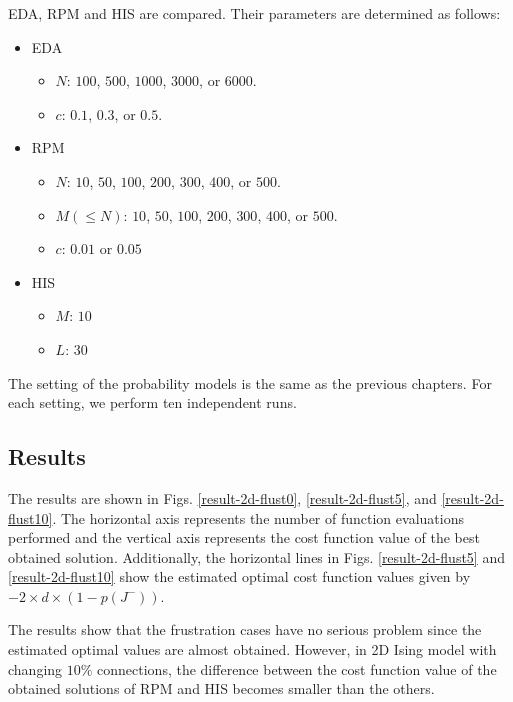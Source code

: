 EDA, RPM and HIS are compared.
Their parameters are determined as follows:
\begin{itemize}
 \item EDA
       \begin{itemize}
	\item $N$: $100$, $500$, $1000$, $3000$, or $6000$.
	\item $c$: $0.1$, $0.3$, or $0.5$.
       \end{itemize}
 \item RPM
       \begin{itemize}
	\item $N$: $10$, $50$, $100$, $200$, $300$, $400$, or $500$.
	\item $M(\leq N)$: $10$, $50$, $100$, $200$, $300$, $400$, or $500$.
	\item $c$: $0.01$ or $0.05$
       \end{itemize}
 \item HIS
       \begin{itemize}
	\item $M$: $10$
	\item $L$: $30$
       \end{itemize}
\end{itemize}
The setting of the probability models is the same as the previous chapters.
For each setting, we perform ten independent runs.


\subsection{Results}
The results are shown in Figs. \ref{result-2d-flust0},
\ref{result-2d-flust5}, and 
\ref{result-2d-flust10}.
The horizontal axis represents the number of function evaluations
performed and
the vertical axis represents the cost function value of the best
obtained solution.
Additionally, the horizontal lines in Figs.
\ref{result-2d-flust5} and 
\ref{result-2d-flust10}
show
the estimated optimal cost function values given by
$-2 \times d \times (1-p(J^-))$. 

The results show that the frustration cases have no serious problem 
since the estimated optimal values are almost obtained.
However, in 2D Ising model with changing $10\%$ connections,
the difference between
the cost function value of the obtained solutions of RPM and HIS
becomes smaller than the others.

